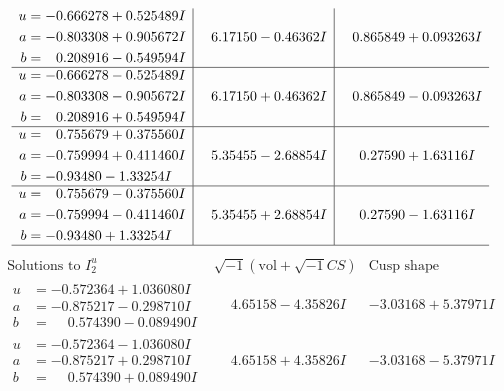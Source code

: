 \documentclass[1p]{elsarticle_modified}
\theoremstyle{definition}
\newcommand{\I}{\sqrt{-1}}
\begin{document}
$$\begin{array}{c|c|c}
\begin{aligned}
u &= -0.666278 + 0.525489 I \\
a &= -0.803308 + 0.905672 I \\
b &= \phantom{-}0.208916 - 0.549594 I\end{aligned}
 & \phantom{-}6.17150 - 0.46362 I & \phantom{-}0.865849 + 0.093263 I \\ \hline\begin{aligned}
u &= -0.666278 - 0.525489 I \\
a &= -0.803308 - 0.905672 I \\
b &= \phantom{-}0.208916 + 0.549594 I\end{aligned}
 & \phantom{-}6.17150 + 0.46362 I & \phantom{-}0.865849 - 0.093263 I \\ \hline\begin{aligned}
u &= \phantom{-}0.755679 + 0.375560 I \\
a &= -0.759994 + 0.411460 I \\
b &= -0.93480 - 1.33254 I\end{aligned}
 & \phantom{-}5.35455 - 2.68854 I & \phantom{-}0.27590 + 1.63116 I \\ \hline\begin{aligned}
u &= \phantom{-}0.755679 - 0.375560 I \\
a &= -0.759994 - 0.411460 I \\
b &= -0.93480 + 1.33254 I\end{aligned}
 & \phantom{-}5.35455 + 2.68854 I & \phantom{-}0.27590 - 1.63116 I\\
 \hline 
 \end{array}$$\newpage$$\begin{array}{c|c|c}  
\text{Solutions to }I^u_{2}& \I (\text{vol} + \sqrt{-1}CS) & \text{Cusp shape}\\
 \hline 
\begin{aligned}
u &= -0.572364 + 1.036080 I \\
a &= -0.875217 - 0.298710 I \\
b &= \phantom{-}0.574390 - 0.089490 I\end{aligned}
 & \phantom{-}4.65158 - 4.35826 I & -3.03168 + 5.37971 I \\ \hline\begin{aligned}
u &= -0.572364 - 1.036080 I \\
a &= -0.875217 + 0.298710 I \\
b &= \phantom{-}0.574390 + 0.089490 I\end{aligned}
 & \phantom{-}4.65158 + 4.35826 I & -3.03168 - 5.37971 I \\ \hline\begin{aligned}

\end{aligned}
\end{array}$$
\end{document}
